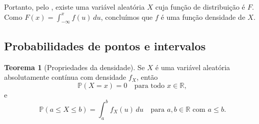 \documentclass[12pt,portuguese]{article}
\theoremstyle{definition}
\newtheorem{theorem}{Teorema}
\theoremstyle{plainexercise}
\theoremstyle{starredexercise}
\theoremstyle{definition}
\begin{document}
Portanto, pelo ,
existe uma variável aleatória $X$ cuja função de
distribuição é $F$. Como $F(x)=\int_{-\infty}^{x}f(u)\,du$, concluímos que $f$
é uma função densidade de $X$.



\subsection{Probabilidades de pontos e intervalos}

\begin{theorem}[Propriedades da densidade]\label{thm:propriedades-densidade}
  Se $X$ é uma variável aleatória absolutamente contínua com densidade $f_X$, então
\begin{equation}\label{eq:prob-ponto}
    \mathbb{P}(X = x) = 0 \quad \text{para todo } x \in \mathbb{R},
\end{equation}
  e
\begin{equation}\label{eq:prob-intervalo}
    \mathbb{P}(a \leqslant X \leqslant b) = \int_a^b f_X(u)\,du
    \quad \text{para } a,b \in \mathbb{R} \text{ com } a \leqslant b.
\end{equation}
\end{theorem}
\end{document}
